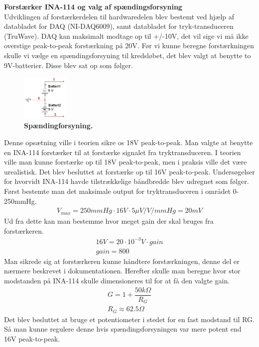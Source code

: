 \textbf{Forstærker INA-114 og valg af spændingsforsyning}\\
Udviklingen af forstærkerdelen til hardwaredelen blev bestemt ved hjælp af databladet for DAQ (NI-DAQ6009), samt databladet for tryk-transduceren (TruWave\texttrademark). DAQ kan maksimalt modtage op til +/-10V, det vil sige vi må ikke overstige peak-to-peak forstærkning på 20V. Før vi kunne beregne forstærkningen skulle vi vælge en spændingsforsyning til kredsløbet, det blev valgt at benytte to 9V-batterier. Disse blev sat op som følger.
\begin{figure}[H]
\includegraphics[width =0.2\textwidth , center]{billeder/spandingsforsyning}
\caption{\textbf{Spændingforsyning.}}
\end{figure}
Denne opsætning ville i teorien sikre os 18V peak-to-peak. Man valgte at benytte en INA-114 forstærker til at forstærke signalet fra tryktransduceren. I teorien ville man kunne forstærke op til 18V peak-to-peak, men i praksis ville det være urealistisk. Det blev besluttet at forstærke op til 16V peak-to-peak. Undersøgelser for hvorvidt INA-114 havde tilstrækkelige båndbredde blev udregnet som følger. Først bestemte man det maksimale output for tryktransduceren i området 0-250mmHg.
\begin{align*}
V_{max}=250mmHg\cdot 16V\cdot5\mu V/V/mmHg =20 mV
\end{align*}
Ud fra dette kan man bestemme hvor meget gain der skal bruges fra forstærkeren.
\begin{align*}
16V = 20\cdot 10^{-3}V\cdot gain\\
gain = 800
\end{align*}
Man sikrede sig at forstærkeren kunne håndtere forstærkningen, denne del er nærmere beskrevet i dokumentationen. Herefter skulle man beregne hvor stor modstanden på INA-114 skulle dimensioneres til for at få den valgte gain.
\begin{align*}
G=1+\dfrac{50k\Omega}{R_G}\\
R_G\approx 62.5\Omega
\end{align*}
Det blev besluttet at bruge et potentiometer i stedet for en fast modstand til RG. Så man kunne regulere denne hvis spændingsforsyningen var mere potent end 16V peak-to-peak.\\\\
